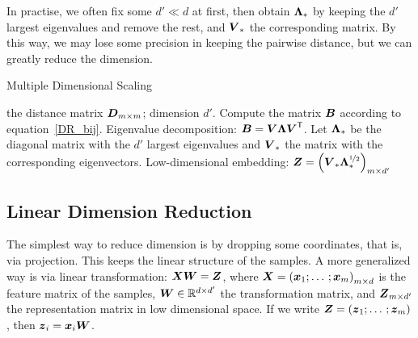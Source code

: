In practise, we often fix some $d' \ll d$ at first, then obtain $\boldsymbol{\Lambda}_*$ by keeping the $d'$ largest 
eigenvalues and remove the rest, and $\boldsymbol{V}_*$ the corresponding matrix. By this way, we may lose some 
precision in keeping the pairwise distance, but we can greatly reduce the dimension.

\begin{algorithm}
    \caption{Multiple Dimensional Scaling}
    \begin{algorithmic}[1]
        \Require the distance matrix $\boldsymbol{D}_{m \times m}$; dimension $d'$.
        \State Compute the matrix $\boldsymbol{B}$ according to equation~\eqref{DR_bij}.
        \State Eigenvalue decomposition: $\boldsymbol{B} = \boldsymbol{V} \boldsymbol{\Lambda}{\boldsymbol{V}}^\mathsf{T}$.
        \State Let $\boldsymbol{\Lambda}_*$ be the diagonal matrix with the $d'$ largest eigenvalues and $\boldsymbol{V}_*$ the
        matrix with the corresponding eigenvectors.
        \Ensure Low-dimensional embedding: $\boldsymbol{Z} = {\left(\boldsymbol{V}_* \boldsymbol{\Lambda}_*^{\nicefrac{1}{2}}\right)}_{m 
        \times d'}$
    \end{algorithmic}
\end{algorithm}

\subsection{Linear Dimension Reduction}
The simplest way to reduce dimension is by dropping some coordinates, that is, via projection. This keeps the
linear structure of the samples. A more generalized way is via linear transformation: $\boldsymbol{X} \boldsymbol{W} = \boldsymbol{Z}$,
where $\boldsymbol{X} = {\left(\boldsymbol{x}_1; \dotsc; \boldsymbol{x}_m\right)}_{m \times d}$ is the feature matrix of the samples, $\boldsymbol{W} \in 
\mathbb{R}^{d \times d'}$ the transformation matrix, and $\boldsymbol{Z}_{m \times d'}$ the representation matrix
in low dimensional space. If we write $\boldsymbol{Z} = {\left(\boldsymbol{z}_1; \dotsc; \boldsymbol{z}_{m}\right)}$, then $\boldsymbol{z}_i =
\boldsymbol{x}_i \boldsymbol{W}$.


